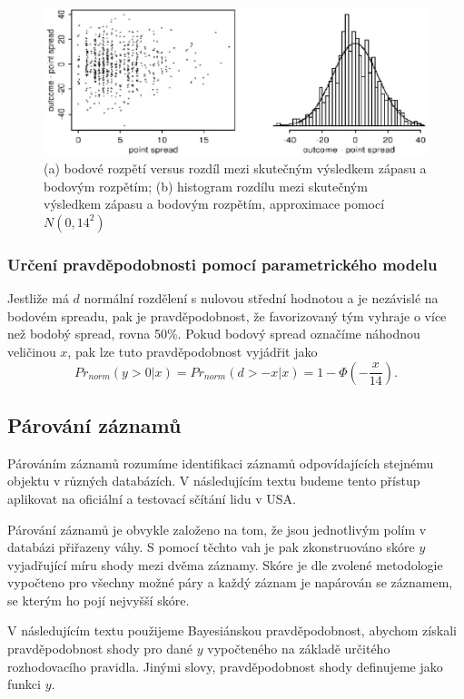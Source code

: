 \begin{figure}[htp]
\centering
\includegraphics[scale = 0.65]{pictures/fig_1_2.eps}
\caption{(a) bodové rozpětí versus rozdíl mezi skutečným výsledkem zápasu a bodovým rozpětím; (b) histogram rozdílu mezi skutečným výsledkem zápasu a bodovým rozpětím, approximace pomocí $N(0, 14^2)$}
\label{fig_1_2}
\end{figure} 

\subsubsection{Určení pravděpodobnosti pomocí parametrického modelu}

Jestliže má $d$ normální rozdělení s nulovou střední hodnotou a je nezávislé na bodovém spreadu, pak je pravděpodobnost, že favorizovaný tým vyhraje o více než bodobý spread, rovna 50\%. Pokud bodový spread označíme náhodnou veličinou $x$, pak lze tuto pravděpodobnost vyjádřit jako
\begin{equation*}
Pr_{norm}(y > 0 | x) = Pr_{norm}(d > -x | x) = 1 - \Phi \left(- \frac{x}{14} \right).
\end{equation*}

\subsection{Párování záznamů}

Párováním záznamů rozumíme identifikaci záznamů odpovídajících stejnému objektu v různých databázích. V následujícím textu budeme tento přístup aplikovat na oficiální a testovací sčítání lidu v USA.

Párování záznamů je obvykle založeno na tom, že jsou jednotlivým polím v databázi přiřazeny váhy. S pomocí těchto vah je pak zkonstruováno skóre $y$ vyjadřující míru shody mezi dvěma záznamy. Skóre je dle zvolené metodologie vypočteno pro všechny možné páry a každý záznam je napárován se záznamem, se kterým ho pojí nejvyšší skóre.

V následujícím textu použijeme Bayesiánskou pravděpodobnost, abychom získali pravděpodobnost shody pro dané $y$ vypočteného na základě určitého rozhodovacího pravidla. Jinými slovy, pravděpodobnost shody definujeme jako funkci $y$.

